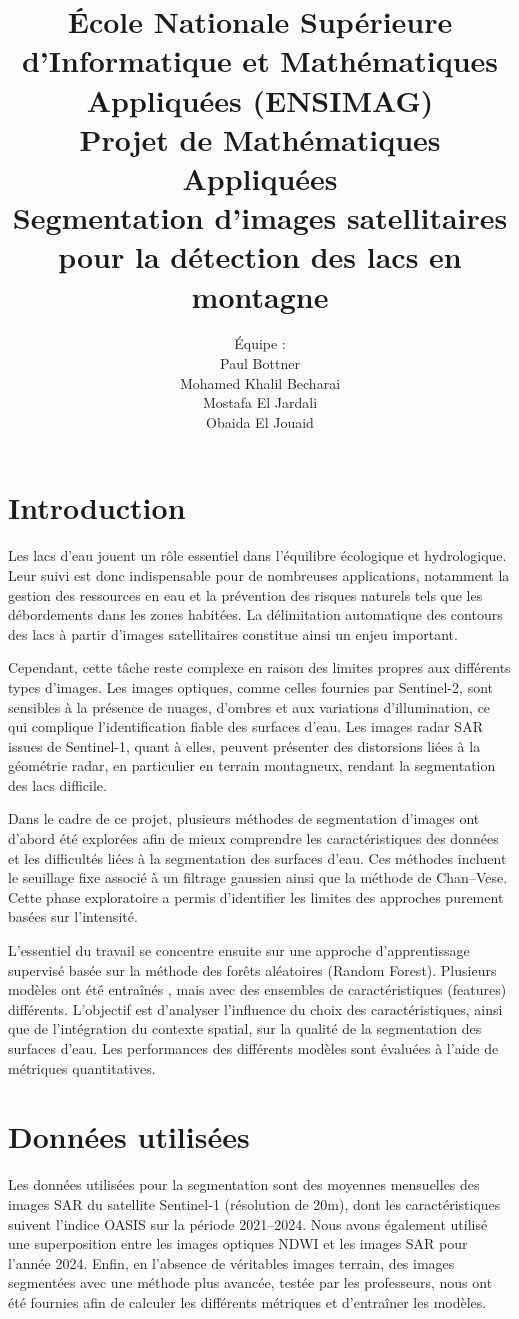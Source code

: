 \documentclass[11pt,a4paper]{article}
\title{École Nationale Supérieure d’Informatique et Mathématiques Appliquées (ENSIMAG)\\[0.5em]
Projet de Mathématiques Appliquées\\
 Segmentation d’images satellitaires pour la détection des lacs en montagne}
\author{
Équipe : \\[0.5em]
Paul Bottner \\
Mohamed Khalil Becharai \\
Mostafa El Jardali \\
Obaida El Jouaid
}
\date{%
\vspace{1em}
\begin{center}
Encadrant : Guillaume James\\
2025-2026
\end{center}
\vspace{1em}
}
\begin{document}
\maketitle

\tableofcontents

\section{Introduction}

Les lacs d’eau jouent un rôle essentiel dans l’équilibre écologique et hydrologique. Leur suivi est donc indispensable pour de nombreuses applications, notamment la gestion des ressources en eau et la prévention des risques naturels tels que les débordements dans les zones habitées. La délimitation automatique des contours des lacs à partir d’images satellitaires constitue ainsi un enjeu important.

Cependant, cette tâche reste complexe en raison des limites propres aux différents types d’images. Les images optiques, comme celles fournies par Sentinel-2, sont sensibles à la présence de nuages, d’ombres et aux variations d’illumination, ce qui complique l’identification fiable des surfaces d’eau. Les images radar SAR issues de Sentinel-1, quant à elles, peuvent présenter des distorsions liées à la géométrie radar, en particulier en terrain montagneux, rendant la segmentation des lacs difficile.

Dans le cadre de ce projet, plusieurs méthodes de segmentation d’images ont d’abord été explorées afin de mieux comprendre les caractéristiques des données et les difficultés liées à la segmentation des surfaces d’eau. Ces méthodes incluent le seuillage fixe associé à un filtrage gaussien ainsi que la méthode de Chan–Vese. Cette phase exploratoire a permis d’identifier les limites des approches purement basées sur l’intensité.

L’essentiel du travail se concentre ensuite sur une approche d’apprentissage supervisé basée sur la méthode des forêts aléatoires (Random Forest). Plusieurs modèles ont été entraînés , mais avec des ensembles de caractéristiques (features) différents. L’objectif est d’analyser l’influence du choix des caractéristiques, ainsi que de l’intégration du contexte spatial, sur la qualité de la segmentation des surfaces d’eau. Les performances des différents modèles sont évaluées à l’aide de métriques quantitatives.

\section{Données utilisées}
Les données utilisées pour la segmentation sont des moyennes mensuelles des images SAR du satellite Sentinel‑1 (résolution de 20m), dont les caractéristiques suivent l’indice OASIS sur la période 2021–2024. Nous avons également utilisé une superposition entre les images optiques NDWI et les images SAR pour l’année 2024. Enfin, en l’absence de véritables images terrain, des images segmentées avec une méthode plus avancée, testée par les professeurs, nous ont été fournies afin de calculer les différents métriques et d’entraîner les modèles.
\end{document}
